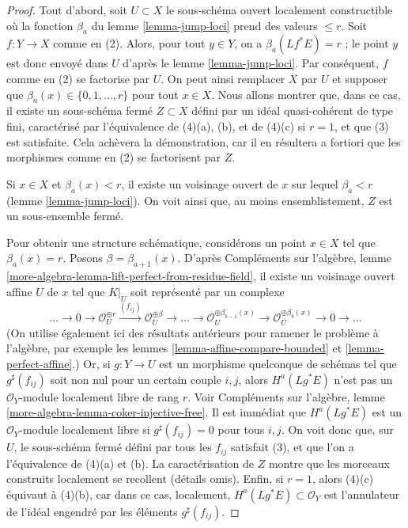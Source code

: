 \begin{proof}
Tout d'abord, soit $U \subset X$ le sous-schéma ouvert
localement constructible où la fonction
$\beta_a$ du lemme \ref{lemma-jump-loci} prend des valeurs $\leq r$.
Soit $f : Y \to X$ comme en (2). Alors, pour tout $y \in Y$,
on a $\beta_a(Lf^*E) = r$ ; le point $y$ est donc envoyé dans $U$ d'après le
lemme \ref{lemma-jump-loci}. Par conséquent, $f$ comme en (2) se factorise par $U$.
On peut ainsi remplacer $X$ par $U$ et supposer que
$\beta_a(x) \in \{0, 1, \ldots, r\}$ pour tout $x \in X$.
Nous allons montrer que, dans ce cas,
il existe un sous-schéma fermé $Z \subset X$ défini par un idéal
quasi-cohérent de type fini, caractérisé
par l'équivalence de (4)(a), (b), et de (4)(c) si $r = 1$,
et que (3) est satisfaite.
Cela achèvera la démonstration, car il en résultera a fortiori
que les morphismes comme en (2) se factorisent par $Z$.

\medskip\noindent
Si $x \in X$ et $\beta_a(x) < r$, il existe un
voisinage ouvert de $x$ sur lequel $\beta_a < r$
(lemme \ref{lemma-jump-loci}). On voit ainsi que,
au moins ensemblistement, $Z$ est un sous-ensemble fermé.

\medskip\noindent
Pour obtenir une structure schématique, considérons un point $x \in X$
tel que $\beta_a(x) = r$. Posons $\beta = \beta_{a + 1}(x)$.
D'après Compléments sur l'algèbre, lemme
\ref{more-algebra-lemma-lift-perfect-from-residue-field},
il existe un voisinage ouvert affine $U$ de $x$
tel que $K|_U$ soit représenté par un complexe
$$
\ldots \to 0 \to \mathcal{O}_U^{\oplus r}
\xrightarrow{(f_{ij})} \mathcal{O}_U^{\oplus \beta} \to
\ldots \to
\mathcal{O}_U^{\oplus \beta_{b - 1}(x)} \to
\mathcal{O}_U^{\oplus \beta_b(x)} \to 0
\to \ldots
$$
(On utilise également ici des résultats antérieurs pour ramener le problème à l'algèbre, par exemple les
lemmes \ref{lemma-affine-compare-bounded} et
\ref{lemma-perfect-affine}.) Or, si $g : Y \to U$ est un morphisme quelconque
de schémas tel que $g^\sharp(f_{ij})$ soit non nul pour un certain couple $i, j$, alors
$H^a(Lg^*E)$ n'est pas un $\mathcal{O}_Y$-module localement libre de rang $r$.
Voir Compléments sur l'algèbre, lemme \ref{more-algebra-lemma-coker-injective-free}.
Il est immédiat que $H^a(Lg^*E)$ est un $\mathcal{O}_Y$-module localement libre si
$g^\sharp(f_{ij}) = 0$ pour tous $i, j$. On voit donc que, sur $U$, le
sous-schéma fermé défini par tous les $f_{ij}$ satisfait
(3), et que l'on a l'équivalence de (4)(a) et (b).
La caractérisation de $Z$ montre que les morceaux construits localement
se recollent (détails omis). Enfin, si $r = 1$, alors
(4)(c) équivaut à (4)(b), car dans ce cas, localement,
$H^a(Lg^*E) \subset \mathcal{O}_Y$ est l'annulateur de l'idéal engendré
par les éléments $g^\sharp(f_{ij})$.
\end{proof}





